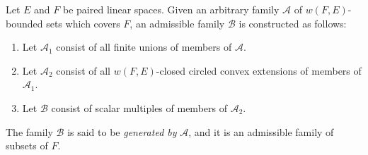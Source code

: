 Let $E$ and $F$ be paired linear spaces. Given an arbitrary family $\mathcal{A}$ of $w(F, E)$-bounded sets which covers $F$, an admissible family $\mathcal{B}$ is constructed as follows:

\begin{enumerate}
\item Let $\mathcal{A}_1$ consist of all finite unions of members of $\mathcal{A}$.
\item Let $\mathcal{A}_2$ consist of all $w(F, E)$-closed circled convex extensions of members of $\mathcal{A}_1$.
\item Let $\mathcal{B}$ consist of scalar multiples of members of $\mathcal{A}_2$.
\end{enumerate}

The family $\mathcal{B}$ is said to be \textit{generated by} $\mathcal{A}$, and it is an admissible family of subsets of $F$.
